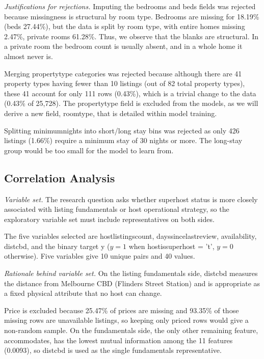 \documentclass[final,1p,11pt]{elsarticle}
\renewcommand\_{\textunderscore\allowbreak}%
\begin{document}
\textit{Justifications for rejections.} Imputing the bedrooms and beds fields was rejected because missingness is structural by room type. Bedrooms are missing for 18.19\% (beds 27.44\%), but the data is split by room type, with entire homes missing 2.47\%, private rooms 61.28\%. Thus, we observe that the blanks are structural. In a private room the bedroom count is usually absent, and in a whole home it almost never is.

Merging property\_type categories was rejected because although there are 41 property types having fewer than 10 listings (out of 82 total property types), these 41 account for only 111 rows (0.43\%), which is a trivial change to the data (0.43\% of 25,728). The property\_type field is excluded from the models, as we will derive a new field, room\_type\_3, that is detailed within model training.

Splitting minimum\_nights into short/long stay bins was rejected as only 426 listings (1.66\%) require a minimum stay of 30 nights or more. The long-stay group would be too small for the model to learn from.

\subsection{Correlation Analysis}

\textit{Variable set.} The research question asks whether superhost status is more closely associated with listing fundamentals or host operational strategy, so the exploratory variable set must include representatives on both sides.

The five variables selected are host\_listings\_count, days\_since\_last\_review, availability\_365, dist\_cbd, and the binary target y ($y = 1$ when host\_is\_superhost = 't', $y = 0$ otherwise). Five variables give 10 unique pairs and 40 values.

\textit{Rationale behind variable set.} On the listing fundamentals side, dist\_cbd measures the distance from Melbourne CBD (Flinders Street Station) and is appropriate as a fixed physical attribute that no host can change.

Price is excluded because 25.47\% of prices are missing and 93.35\% of those missing rows are unavailable listings, so keeping only priced rows would give a non-random sample. On the fundamentals side, the only other remaining feature, accommodates, has the lowest mutual information among the 11 features (0.0093), so dist\_cbd is used as the single fundamentals representative.
\end{document}
